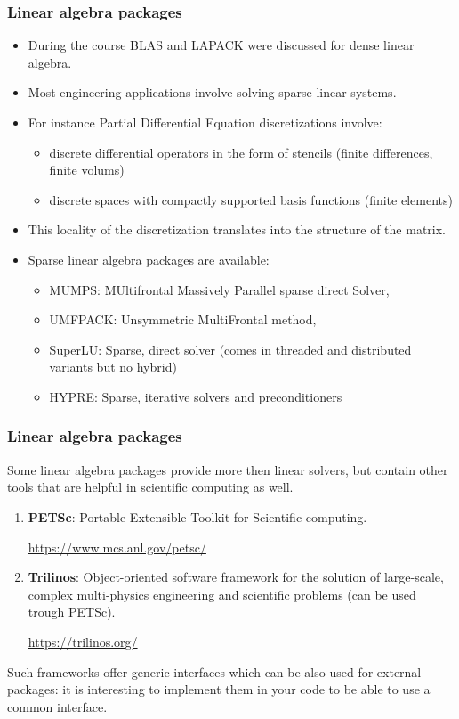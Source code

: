 \begin{frame}
  \frametitle{Linear algebra packages}
  \begin{itemize}
  \item During the course BLAS and LAPACK were discussed for dense linear algebra.
  \item Most engineering applications involve solving sparse linear systems.
  \item For instance Partial Differential Equation discretizations  involve:
  \begin{itemize}
  \item discrete differential operators in the form of stencils (finite differences, finite volums)
  \item discrete spaces with compactly supported basis functions (finite elements)
  \end{itemize}
  \item This locality of the discretization translates into the structure of the matrix.
  \item Sparse linear algebra packages are available:
    \begin{itemize}
    \item MUMPS: MUltifrontal Massively Parallel sparse direct Solver,
    \item UMFPACK: Unsymmetric MultiFrontal method,
    \item SuperLU: Sparse, direct solver (comes in threaded and distributed
      variants but no hybrid)
    \item HYPRE: Sparse, iterative solvers and preconditioners
    \end{itemize}
  \end{itemize}
\end{frame}

\begin{frame}
  \frametitle{Linear algebra packages}
  Some linear algebra packages provide more then linear solvers, but contain other
  tools that are helpful in scientific computing as well.
  \begin{enumerate}
\medskip
  \item \textbf{PETSc}: Portable Extensible Toolkit for Scientific computing.
\begin{center}
\url{https://www.mcs.anl.gov/petsc/}
\end{center}
\medskip
  \item \textbf{Trilinos}: Object-oriented software framework for the solution of large-scale, complex multi-physics engineering and scientific problems (can be used trough PETSc).
\begin{center}
\url{https://trilinos.org/}
\end{center}
  \end{enumerate}
  

\medskip
Such frameworks offer generic interfaces which can be also used for external packages: it is interesting to implement them in your code to be able to use a common interface.

\end{frame}

